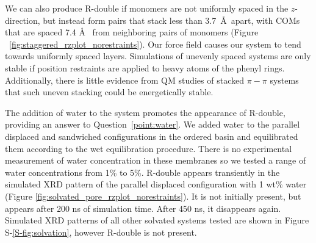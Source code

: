 \documentclass[journal=jpcbfk,manuscript=article]{achemso}
\begin{document}
  We can also produce R-double if monomers are not uniformly spaced in the
  $z$-direction, but instead form pairs that stack less than 3.7~\AA~apart, with
  COMs that are spaced 7.4 \AA~ from neighboring pairs of monomers (Figure
  ~\ref{fig:staggered_rzplot_norestraints}). 
  Our force field causes our system to tend towards uniformly spaced layers.
  Simulations of unevenly spaced systems are only stable if position restraints
  are applied to heavy atoms of the phenyl rings.  Additionally, there is little
  evidence from QM studies of stacked $\pi-\pi$ systems that such uneven stacking
  could be energetically stable.~\cite{tauer_beyond_2005} 
  
  The addition of water to the system promotes the appearance of R-double, providing
  an answer to Question~\ref{point:water}.
  We added water to the parallel displaced and sandwiched configurations in the
  ordered basin and equilibrated them according to the wet equilibration
  procedure. There is no experimental measurement of water concentration in these
  membranes so we tested a range of water concentrations from 1\% to 5\%.
  R-double appears transiently in the simulated XRD pattern of the parallel
  displaced configuration with 1 wt\% water (Figure
  \ref{fig:solvated_pore_rzplot_norestraints}). It is not initially present, but
  appears after 200 ns of simulation time. After 450 ns, it disappears again.
  Simulated XRD patterns of all other solvated systems tested are shown in Figure
  S-\ref{S-fig:solvation}, however R-double is not present.
\end{document}
